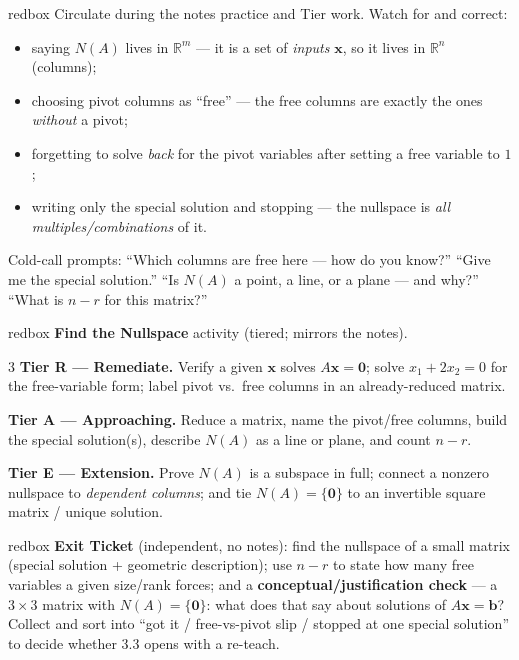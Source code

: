 \documentclass[10pt]{article}
\newcommand{\xx}{\mathbf{x}}
\newcommand{\bb}{\mathbf{b}}
\newcommand{\zero}{\mathbf{0}}
\begin{document}
\begin{skillbox}{redbox}
Circulate during the notes practice and Tier work. Watch for and correct:
\begin{itemize}[leftmargin=1.2em, nosep]
  \item saying $N(A)$ lives in $\mathbb{R}^m$ --- it is a set of \emph{inputs} $\xx$, so it lives in $\mathbb{R}^n$ (columns);
  \item choosing pivot columns as ``free'' --- the free columns are exactly the ones \emph{without} a pivot;
  \item forgetting to solve \emph{back} for the pivot variables after setting a free variable to $1$;
  \item writing only the special solution and stopping --- the nullspace is \emph{all multiples/combinations} of it.
\end{itemize}
Cold-call prompts: ``Which columns are free here --- how do you know?'' ``Give me the special solution.''
``Is $N(A)$ a point, a line, or a plane --- and why?'' ``What is $n-r$ for this matrix?''
\end{skillbox}

\begin{skillbox}{redbox}
\textbf{Find the Nullspace} activity (tiered; mirrors the notes).
\begin{multicols}{3}
\textbf{Tier R --- Remediate.} Verify a given $\xx$ solves $A\xx=\zero$; solve $x_1+2x_2=0$ for the
free-variable form; label pivot vs.\ free columns in an already-reduced matrix.

\columnbreak
\textbf{Tier A --- Approaching.} Reduce a matrix, name the pivot/free columns, build the special
solution(s), describe $N(A)$ as a line or plane, and count $n-r$.

\columnbreak
\textbf{Tier E --- Extension.} Prove $N(A)$ is a subspace in full; connect a nonzero nullspace to
\emph{dependent columns}; and tie $N(A)=\{\zero\}$ to an invertible square matrix / unique solution.
\end{multicols}
\end{skillbox}

\begin{skillbox}{redbox}
\textbf{Exit Ticket} (independent, no notes): find the nullspace of a small matrix (special solution
+ geometric description); use $n-r$ to state how many free variables a given size/rank forces; and a
\textbf{conceptual/justification check} --- a $3\times3$ matrix with $N(A)=\{\zero\}$: what does that
say about solutions of $A\xx=\bb$? Collect and sort into ``got it / free-vs-pivot slip / stopped at
one special solution'' to decide whether 3.3 opens with a re-teach.
\end{skillbox}
\end{document}
